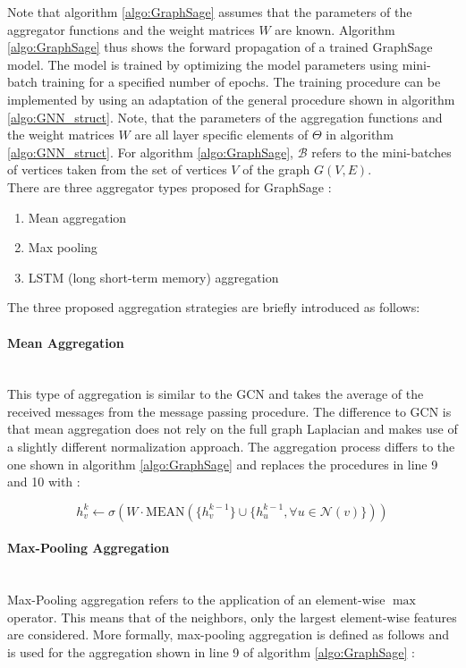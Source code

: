 	\noindent Note that algorithm \ref{algo:GraphSage} assumes that the
	parameters of the aggregator functions and the weight matrices $W$
	are known. Algorithm \ref{algo:GraphSage} thus shows the forward
	propagation of a trained GraphSage model. The model is trained by
	optimizing the model parameters using mini-batch training for a specified 
	number of epochs. The training procedure can be implemented by using an
	adaptation of the general procedure shown in algorithm \ref{algo:GNN_struct}. 
	Note, that the parameters of the aggregation functions and the weight 
	matrices $W$ are all layer specific elements of $\Theta$ in algorithm 
	\ref{algo:GNN_struct}. For algorithm \ref{algo:GraphSage}, $\mathcal{B}$ 
	refers to the mini-batches of vertices taken from the set of vertices $V$ 
	of the graph $G(V,E)$. \\
	\newpage
	\noindent There are three aggregator types proposed for GraphSage
	\citep{hamilton2017inductive}:

	\begin{enumerate}
		\setlength\itemsep{0.2em}
		\item Mean aggregation
		\item Max pooling
		\item LSTM (long short-term memory) aggregation
	\end{enumerate}

	\noindent The three proposed aggregation strategies are briefly introduced
	as follows:

	\paragraph{Mean Aggregation} \mbox{}\\
	\noindent This type of aggregation is similar to the GCN and takes the
	average of the received messages from the message passing procedure. The 
	difference to GCN is that mean aggregation does not rely on the full graph 
	Laplacian and makes use of a slightly different normalization approach. The 
	aggregation process differs to the one shown in algorithm 
	\ref{algo:GraphSage} and replaces the procedures in line 9 and 10 with 
	\citep[p. 5]{hamilton2017inductive}:

	\begin{equation}
		h_{v}^{k} \leftarrow \sigma\left(W\cdot
		\text{MEAN}(\{h_{v}^{k-1}\}\cup\{h_{u}^{k-1},\forall u \in \mathcal{N}(v)\})\right)
	\end{equation}

	\paragraph{Max-Pooling Aggregation} \mbox{}\\
	\noindent Max-Pooling aggregation refers to the application of an 
	element-wise $\max$ operator. This means 
	that of the neighbors, only the largest element-wise features are considered. 
	More formally, max-pooling aggregation is defined as follows and is used 
	for the aggregation shown in line 9 of algorithm \ref{algo:GraphSage} 
	\citep[p. 6]{hamilton2017inductive}:

